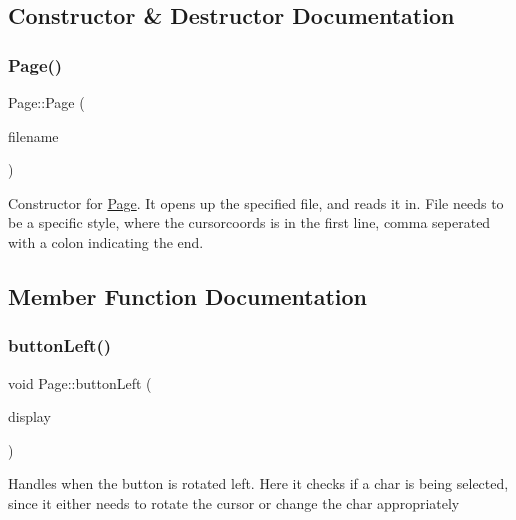 \subsection{Constructor \& Destructor Documentation}
\mbox{\label{class_page_a8348344aff8c2ec7e7f1d52edf2eb99f}} 
\subsubsection{\texorpdfstring{Page()}{Page()}}
{\footnotesize\ttfamily Page\+::\+Page (\begin{DoxyParamCaption}\item[{std\+::string}]{filename }\end{DoxyParamCaption})\hspace{0.3cm}{\ttfamily [inline]}}

Constructor for \hyperlink{class_page}{Page}. It opens up the specified file, and reads it in. File needs to be a specific style, where the cursorcoords is in the first line, comma seperated with a colon indicating the end. 

\subsection{Member Function Documentation}
\mbox{\label{class_page_a741e3788b484622f2426a9f0134e34c9}} 
\subsubsection{\texorpdfstring{button\+Left()}{buttonLeft()}}
{\footnotesize\ttfamily void Page\+::button\+Left (\begin{DoxyParamCaption}\item[{\hyperlink{class_l_c_d}{L\+CD} $\ast$}]{display }\end{DoxyParamCaption})\hspace{0.3cm}{\ttfamily [inline]}}

Handles when the button is rotated left. Here it checks if a char is being selected, since it either needs to rotate the cursor or change the char appropriately \mbox{\label{class_page_a8c7dd5910785a3a69e0644a3159ecf12}} 
